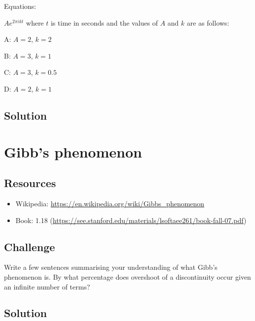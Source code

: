Equations:

$\displaystyle A e^{2 \pi i k t}$ where $t$ is time in seconds and the values of $A$ and $k$ are as follows:

A: $A=2$, $k=2$ 

B: $A=3$, $k=1$

C: $A=3$, $k=0.5$

D: $A=2$, $k=1$

\subsection*{Solution}
\six{}


\timebox




\newpage
\section{Gibb's phenomenon}

\subsection*{Resources}
\begin{itemize}
    \item Wikipedia: \url{https://en.wikipedia.org/wiki/Gibbs_phenomenon}
    \item Book: 1.18 (\url{https://see.stanford.edu/materials/lsoftaee261/book-fall-07.pdf})
\end{itemize}

\subsection*{Challenge}
Write a few sentences summarising your understanding of what Gibb's phenomenon is. By what percentage does overshoot of a discontinuity occur given an infinite number of terms?

\subsection*{Solution}
\six{\%}


\timebox








